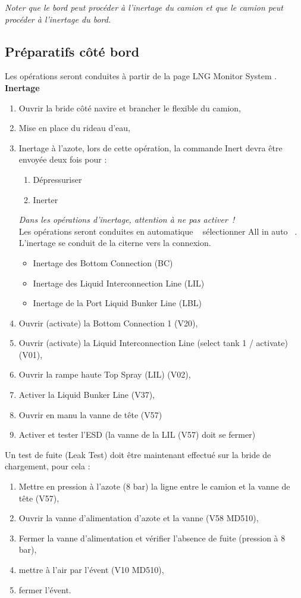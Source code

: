 \documentclass[12pt,a4paper]{article}
\newcommand{\gui}[1]
{\og #1 \fg~}
\begin{document}
 \emph{Noter que le bord peut procéder à l'inertage du camion et que le camion peut procéder à l'inertage du bord.}
 \subsection*{Préparatifs côté bord}
Les opérations seront conduites à partir de la page \og LNG Monitor System \fg.
\\
\textbf{Inertage}
\begin{enumerate}
 \item Ouvrir la bride côté navire et brancher le flexible du camion,
 \item Mise en place du rideau d'eau,
 \item Inertage à l'azote, lors de cette opération, la commande Inert devra être envoyée deux fois pour :
 \begin{enumerate}
  \item Dépressuriser
  \item Inerter
 \end{enumerate}

    \emph{Dans les opérations d'inertage, attention à ne pas \og activer~\fg !}\\
Les opérations seront conduites en \gui{automatique} sélectionner \gui{All in auto}. L'inertage se conduit de la citerne vers la connexion.
    \begin{itemize}
        \item Inertage des Bottom Connection (BC)
        \item Inertage des Liquid Interconnection Line (LIL)
        \item Inertage de la Port Liquid Bunker Line (LBL)
    \end{itemize}
 \item Ouvrir (activate) la Bottom Connection 1 (V20),
 \item Ouvrir (activate) la Liquid Interconnection Line (select tank 1 / activate) (V01),
 \item Ouvrir la rampe haute Top Spray (LIL) (V02),
 \item Activer la Liquid Bunker Line (V37),
 \item Ouvrir en manu la vanne de tête (V57)
 \item Activer et tester l'ESD (la vanne de la LIL (V57)  doit se fermer)
\end{enumerate}
Un test de fuite (Leak Test) doit être maintenant effectué sur la bride de chargement, pour cela :\\
\begin{enumerate}
\item Mettre en pression à l'azote (8 bar) la ligne entre le camion et la vanne de tête (V57), 
 
 \item Ouvrir la vanne d'alimentation d'azote et la vanne (V58 MD510),
 \item Fermer la vanne d'alimentation et vérifier l'absence de fuite (pression à 8 bar),
 \item mettre à l'air par l'évent (V10 MD510),
 \item fermer l'évent.
\end{enumerate}
\end{document}
